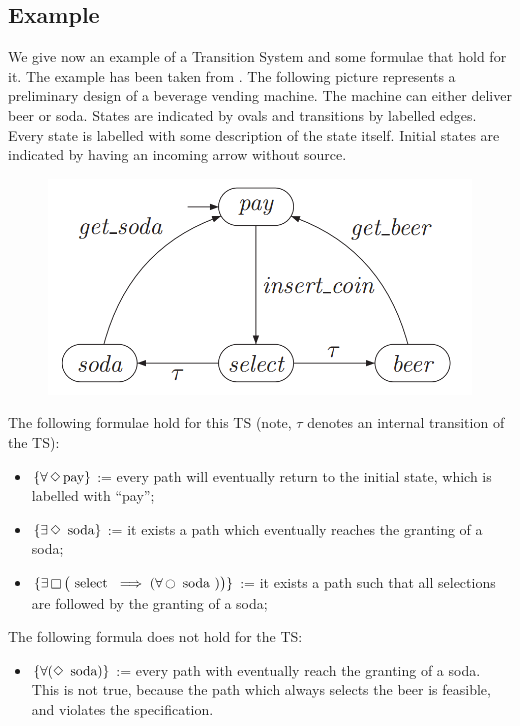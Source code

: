 \documentclass{article}
\begin{document}
\subsection{Example} \label{subsec:example}
We give now an example of a Transition System and some formulae that hold for it. The example has been taken from \cite[Paragraph 2.1]{BaKa}.
The following picture represents a preliminary design of a beverage vending machine. The machine can either deliver beer or soda. States are indicated by ovals and transitions by labelled edges. Every state is labelled with some description of the state itself. Initial states are indicated by having an incoming arrow without source.
\begin{figure}[H]
  \begin{center}
      \includegraphics[scale = 0.50]{pictures/example.png}
  \end{center}
\end{figure}
The following formulae hold for this TS (note, $\tau$ denotes an internal transition of the TS):
\begin{itemize}
    \item $\{ \forall \mathop{\Diamond}  \text{pay} \}$ := every path will eventually return to the initial state, which is labelled with ``pay'';
    \item $\{ \exists \mathop{\Diamond} \text{ soda} \}$ := it exists a path which eventually reaches the granting of a soda;
    \item $\{ \exists \mathop{\square} \big(\text{ select } \implies  (\forall \mathop{\ocircle} \text{ soda })\big) \}$ := it exists a path such that all selections are followed by the granting of a soda;
\end{itemize}
The following formula does not hold for the TS:
\begin{itemize}
    \item $\{ \forall (\mathop{\Diamond} \text{ soda}) \}$ := every path with eventually reach the granting of a soda. This is not true, because the path which always selects the beer is feasible, and violates the specification.
\end{itemize}
\end{document}
